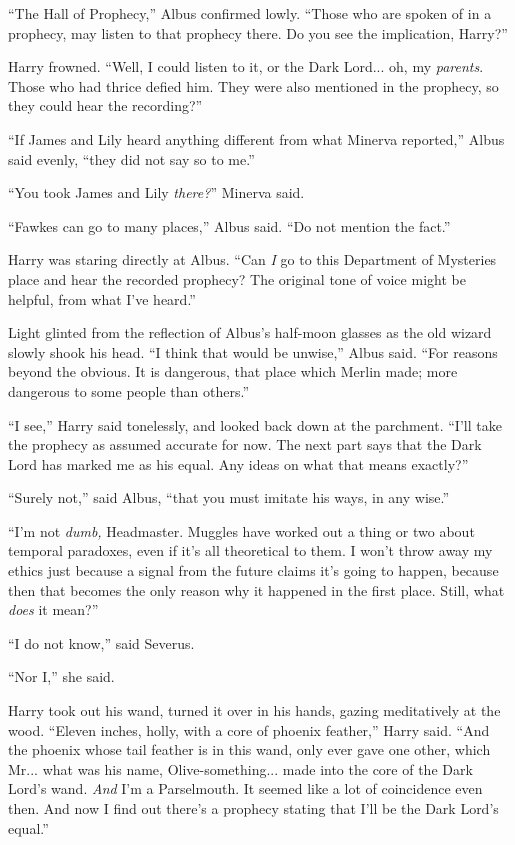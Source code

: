 “The Hall of Prophecy,” Albus confirmed lowly. “Those who are spoken of in a prophecy, may listen to that prophecy there. Do you see the implication, Harry?”

Harry frowned. “Well, I could listen to it, or the Dark Lord... oh, my \emph{parents}. Those who had thrice defied him. They were also mentioned in the prophecy, so they could hear the recording?”

“If James and Lily heard anything different from what Minerva reported,” Albus said evenly, “they did not say so to me.”

“You took James and Lily \emph{there?}” Minerva said.

“Fawkes can go to many places,” Albus said. “Do not mention the fact.”

Harry was staring directly at Albus. “Can \emph{I} go to this Department of Mysteries place and hear the recorded prophecy? The original tone of voice might be helpful, from what I’ve heard.”

Light glinted from the reflection of Albus’s half-moon glasses as the old wizard slowly shook his head. “I think that would be unwise,” Albus said. “For reasons beyond the obvious. It is dangerous, that place which Merlin made; more dangerous to some people than others.”

“I see,” Harry said tonelessly, and looked back down at the parchment. “I’ll take the prophecy as assumed accurate for now. The next part says that the Dark Lord has marked me as his equal. Any ideas on what that means exactly?”

“Surely not,” said Albus, “that you must imitate his ways, in any wise.”

“I’m not \emph{dumb,} Headmaster. Muggles have worked out a thing or two about temporal paradoxes, even if it’s all theoretical to them. I won’t throw away my ethics just because a signal from the future claims it’s going to happen, because then that becomes the only reason why it happened in the first place. Still, what \emph{does} it mean?”

“I do not know,” said Severus.

“Nor I,” she said.

Harry took out his wand, turned it over in his hands, gazing meditatively at the wood. “Eleven inches, holly, with a core of phoenix feather,” Harry said. “And the phoenix whose tail feather is in this wand, only ever gave one other, which Mr... what was his name, Olive-something... made into the core of the Dark Lord’s wand. \emph{And} I’m a Parselmouth. It seemed like a lot of coincidence even then. And now I find out there’s a prophecy stating that I’ll be the Dark Lord’s equal.”

